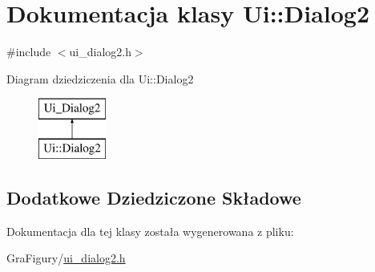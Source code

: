 \hypertarget{classUi_1_1Dialog2}{\section{Dokumentacja klasy Ui\-:\-:Dialog2}
\label{classUi_1_1Dialog2}
}


{\ttfamily \#include $<$ui\-\_\-dialog2.\-h$>$}

Diagram dziedziczenia dla Ui\-:\-:Dialog2\begin{figure}[H]
\begin{center}
\leavevmode
\includegraphics[height=2.000000cm]{classUi_1_1Dialog2}
\end{center}
\end{figure}
\subsection*{Dodatkowe Dziedziczone Składowe}


Dokumentacja dla tej klasy została wygenerowana z pliku\-:\begin{DoxyCompactItemize}
\item 
Gra\-Figury/\hyperlink{ui__dialog2_8h}{ui\-\_\-dialog2.\-h}\end{DoxyCompactItemize}

